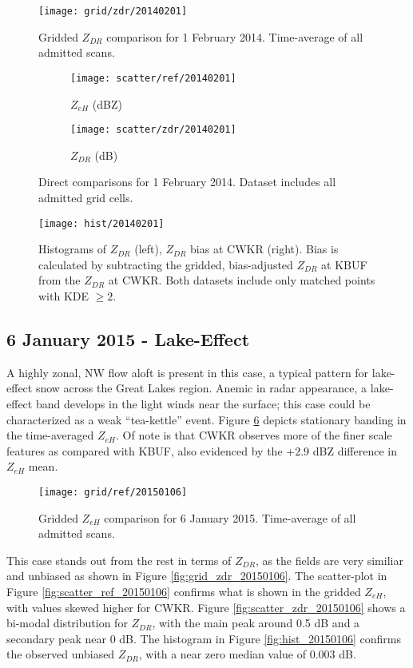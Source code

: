 \begin{figure}[H]
\texttt{[image: grid/zdr/20140201]}
\caption{Gridded $Z_{DR}$ comparison for 1 February 2014. Time-average of all admitted scans.} 
\label{fig:grid_zdr_20140201}
\end{figure}

\begin{figure}[H]
\centering
   \begin{subfigure}{0.49\linewidth} \centering
     \texttt{[image: scatter/ref/20140201]}
     \caption{$Z_{eH}$ (dBZ)}\label{fig:scatter_ref_20140201}
   \end{subfigure}
   \begin{subfigure}{0.49\linewidth} \centering
     \texttt{[image: scatter/zdr/20140201]}
     \caption{$Z_{DR}$ (dB)}\label{fig:scatter_zdr_20140201}
   \end{subfigure}
\caption{Direct comparisons for 1 February 2014. Dataset includes all admitted grid cells.} \label{fig:scatter_20140201}
\end{figure}

\begin{figure}[H]
\texttt{[image: hist/20140201]}\centering
\caption{Histograms of $Z_{DR}$ (left), $Z_{DR}$ bias at CWKR (right). Bias is calculated by subtracting the gridded, bias-adjusted $Z_{DR}$ at KBUF from the
$Z_{DR}$ at CWKR. Both datasets include only matched points with KDE $\geq 2$.} 
\label{fig:hist_20140201}
\end{figure}

\subsection{6 January 2015 - Lake-Effect}
A highly zonal, NW flow aloft is present in this case, a typical pattern for lake-effect snow across the Great Lakes region. Anemic in radar appearance, a
lake-effect band develops in the light winds near the surface; this case could be characterized as a weak ``tea-kettle'' event. Figure
\ref{fig:grid_ref_20150106} depicts stationary banding in the time-averaged $Z_{eH}$. Of note is that CWKR observes more of the finer scale features as
compared with KBUF, also evidenced by the +2.9 dBZ difference in $Z_{eH}$ mean. 
\begin{figure}[H]
\texttt{[image: grid/ref/20150106]}
\caption{Gridded $Z_{eH}$ comparison for 6 January 2015. Time-average of all admitted scans.} 
\label{fig:grid_ref_20150106}
\end{figure}
This case stands out from the rest in terms of $Z_{DR}$, as the fields are
very similiar and unbiased as shown in Figure \ref{fig:grid_zdr_20150106}. The scatter-plot in Figure
\ref{fig:scatter_ref_20150106} confirms what is shown in the gridded $Z_{eH}$, with values skewed higher for CWKR. Figure \ref{fig:scatter_zdr_20150106}
shows a bi-modal distribution for $Z_{DR}$, with the
main peak around 0.5 dB and a secondary peak near 0 dB. The histogram in Figure
\ref{fig:hist_20150106} confirms the observed unbiased $Z_{DR}$, with a near zero median value of 0.003 dB.


